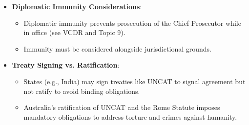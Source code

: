 \begin{itemize}
\begin{itemize}
    \end{itemize}
    \item \textbf{Diplomatic Immunity Considerations}:
    \begin{itemize}
        \item Diplomatic immunity prevents prosecution of the Chief Prosecutor while in office (see VCDR and Topic 9).
        \item Immunity must be considered alongside jurisdictional grounds.
    \end{itemize}
    \item \textbf{Treaty Signing vs. Ratification}:
    \begin{itemize}
        \item States (e.g., India) may sign treaties like UNCAT to signal agreement but not ratify to avoid binding obligations.
        \item Australia’s ratification of UNCAT and the Rome Statute imposes mandatory obligations to address torture and crimes against humanity.
    \end{itemize}
\end{itemize}

